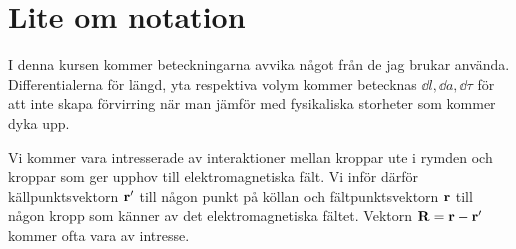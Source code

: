 \section{Lite om notation}

I denna kursen kommer beteckningarna avvika något från de jag brukar använda. Differentialerna för längd, yta respektiva volym kommer betecknas $\dd{l}, \dd{a}, \dd{\tau}$ för att inte skapa förvirring när man jämför med fysikaliska storheter som kommer dyka upp.

Vi kommer vara intresserade av interaktioner mellan kroppar ute i rymden och kroppar som ger upphov till elektromagnetiska fält. Vi inför därför källpunktsvektorn $\vb{r}'$ till någon punkt på köllan och fältpunktsvektorn $\vb{r}$ till någon kropp som känner av det elektromagnetiska fältet. Vektorn $\vb{R} = \vb{r} - \vb{r}'$ kommer ofta vara av intresse.